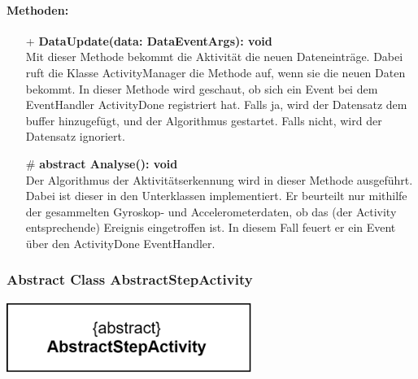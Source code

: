 \documentclass[a4paper,12pt]{article}
\begin{document}
	\paragraph{Methoden:}
	\begin{itemize}
		\item[+] \textbf{DataUpdate(data: DataEventArgs): void}\\Mit dieser Methode bekommt die Aktivität die neuen Dateneinträge. Dabei ruft die Klasse ActivityManager die Methode auf, wenn sie die neuen Daten bekommt. In dieser Methode wird geschaut, ob sich ein Event bei dem EventHandler ActivityDone registriert hat. Falls ja, wird der Datensatz dem buffer hinzugefügt, und der Algorithmus gestartet. Falls nicht, wird der Datensatz ignoriert.
		\item[\#] \textbf{abstract Analyse(): void}\\Der Algorithmus der Aktivitätserkennung wird in dieser Methode ausgeführt. Dabei ist dieser in den Unterklassen implementiert. Er beurteilt nur mithilfe der gesammelten Gyroskop- und Accelerometerdaten, ob das (der Activity entsprechende) Ereignis eingetroffen ist. In diesem Fall feuert er ein Event über den ActivityDone EventHandler. 
	\end{itemize}
	
	\begin{minipage}[b]{0.6\textwidth}
		\subsubsection{Abstract Class AbstractStepActivity}
	\end{minipage}
	\begin{minipage}[c]{0.5\textwidth}
		\includegraphics[width=0.6\textwidth]{bilder/EMKlassen/AbstractStepActivityClass.png}
	\end{minipage}
\end{document}
